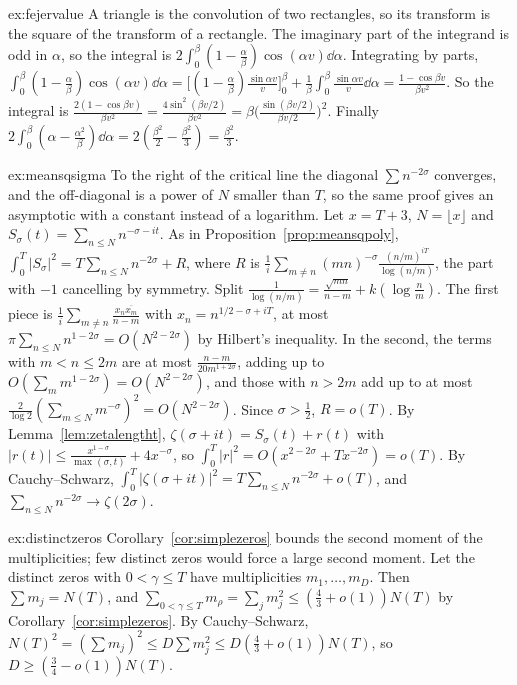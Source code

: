 \begin{solution}{ex:fejervalue}
\idea A triangle is the convolution of two rectangles, so its transform is the square of the transform of a rectangle.
\writeup The imaginary part of the integrand is odd in $\alpha$, so the integral is $2\int_0^\beta(1-\frac\alpha\beta)\cos(\alpha v)\dd\alpha$. Integrating by parts, $\int_0^\beta(1-\frac\alpha\beta)\cos(\alpha v)\dd\alpha=\bigl[(1-\frac\alpha\beta)\frac{\sin\alpha v}v\bigr]_0^\beta+\frac1\beta\int_0^\beta\frac{\sin\alpha v}v\dd\alpha=\frac{1-\cos\beta v}{\beta v^2}$. So the integral is $\frac{2(1-\cos\beta v)}{\beta v^2}=\frac{4\sin^2(\beta v/2)}{\beta v^2}=\beta\bigl(\frac{\sin(\beta v/2)}{\beta v/2}\bigr)^2$. Finally $2\int_0^\beta(\alpha-\frac{\alpha^2}\beta)\dd\alpha=2(\frac{\beta^2}2-\frac{\beta^2}3)=\frac{\beta^2}3$.
\end{solution}

\begin{solution}{ex:meansqsigma}
\idea To the right of the critical line the diagonal $\sum n^{-2\sigma}$ converges, and the off-diagonal is a power of $N$ smaller than $T$, so the same proof gives an asymptotic with a constant instead of a logarithm.
\writeup Let $x=T+3$, $N=\lfloor x\rfloor$ and $S_\sigma(t)=\sum_{n\le N}n^{-\sigma-it}$. As in Proposition~\ref{prop:meansqpoly}, $\int_0^T|S_\sigma|^2=T\sum_{n\le N}n^{-2\sigma}+R$, where $R$ is $\frac1i\sum_{m\ne n}(mn)^{-\sigma}\frac{(n/m)^{iT}}{\log(n/m)}$, the part with $-1$ cancelling by symmetry. Split $\frac1{\log(n/m)}=\frac{\sqrt{mn}}{n-m}+k(\log\frac nm)$. The first piece is $\frac1i\sum_{m\ne n}\frac{x_n\overline{x_m}}{n-m}$ with $x_n=n^{1/2-\sigma+iT}$, at most $\pi\sum_{n\le N}n^{1-2\sigma}=O(N^{2-2\sigma})$ by Hilbert's inequality. In the second, the terms with $m<n\le2m$ are at most $\frac{n-m}{20m^{1+2\sigma}}$, adding up to $O(\sum_mm^{1-2\sigma})=O(N^{2-2\sigma})$, and those with $n>2m$ add up to at most $\frac2{\log2}(\sum_{m\le N}m^{-\sigma})^2=O(N^{2-2\sigma})$. Since $\sigma>\frac12$, $R=o(T)$.
By Lemma~\ref{lem:zetalengtht}, $\zeta(\sigma+it)=S_\sigma(t)+r(t)$ with $|r(t)|\le\frac{x^{1-\sigma}}{\max(\sigma,t)}+4x^{-\sigma}$, so $\int_0^T|r|^2=O(x^{2-2\sigma}+Tx^{-2\sigma})=o(T)$. By Cauchy--Schwarz, $\int_0^T|\zeta(\sigma+it)|^2=T\sum_{n\le N}n^{-2\sigma}+o(T)$, and $\sum_{n\le N}n^{-2\sigma}\to\zeta(2\sigma)$.
\end{solution}

\begin{solution}{ex:distinctzeros}
\idea Corollary~\ref{cor:simplezeros} bounds the second moment of the multiplicities; few distinct zeros would force a large second moment.
\writeup Let the distinct zeros with $0<\gamma\le T$ have multiplicities $m_1,\dots,m_D$. Then $\sum m_j=N(T)$, and $\sum_{0<\gamma\le T}m_\rho=\sum_jm_j^2\le(\frac43+o(1))N(T)$ by Corollary~\ref{cor:simplezeros}. By Cauchy--Schwarz, $N(T)^2=(\sum m_j)^2\le D\sum m_j^2\le D(\frac43+o(1))N(T)$, so $D\ge(\frac34-o(1))N(T)$.
\end{solution}


